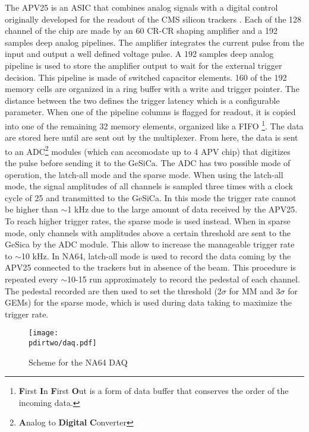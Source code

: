 The APV25 is an ASIC that combines analog signals with a digital control \cite{Bodlak_2013} originally developed for the readout of the CMS silicon trackers \cite{article,inproceedings,apv-useguide}. Each of the 128 channel of the chip are made by an 60 \nas CR-CR shaping amplifier and a 192 samples deep analog pipelines. The amplifier integrates the current pulse from the input and output a well defined voltage pulse. A 192 samples deep analog pipeline is used to store the amplifier output to wait for the external trigger decision. This pipeline is made of switched capacitor elements. 160 of the 192 memory cells are organized in a ring buffer with a write and trigger pointer. The distance between the two defines the trigger latency which is a configurable parameter. When one of the pipeline columns is flagged for readout, it is copied into one of the remaining 32 memory elements, organized like a FIFO \footnote[]{\textbf{F}irst \textbf{I}n \textbf{F}irst \textbf{O}ut is a form of data buffer that conserves the order of the incoming data.}. The data are stored here until are sent out by the multiplexer. From here, the data is sent to an ADC\footnote{\textbf{A}nalog to \textbf{Digital} \textbf{C}onverter} modules (which can accomodate up to 4 APV chip) that digitizes the pulse before sending it to the GeSiCa. The ADC has two possible mode of operation, the latch-all mode and the sparse mode. When using the latch-all mode, the signal amplitudes of all channels is sampled three times with a clock cycle of 25 \nas and transmitted to the GeSiCa. In this mode the trigger rate cannot be higher than $\sim$1 \si{\kilo\hertz} due to the large amount of data received by the APV25. To reach higher trigger rates, the sparse mode is used instead. When in sparse mode, only channels with amplitudes above a certain threshold are sent to the GeSica by the ADC module. This allow to increase the manageable trigger rate to $\sim$10 \si{\kilo\hertz}. In NA64, latch-all mode is used to record the data coming by the APV25 connected to the trackers but in absence of the beam. This procedure is repeated every $\sim$10-15 run approximately to record the pedestal of each channel. The pedestal recorded are then used to set the threshold (2$\sigma$ for MM and 3$\sigma$ for GEMs) for the sparse mode, which is used during data taking to maximize the trigger rate.

\begin{figure}[tbh!]
  \centering
  \texttt{[image: \\pdirtwo/daq.pdf]}
  \caption{Scheme for the NA64 DAQ}
  \label{fig:daq}
\end{figure}

